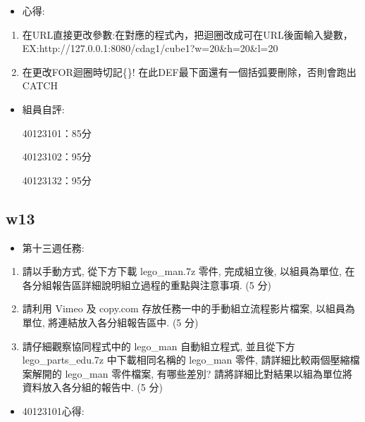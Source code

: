 \documentclass[]{article}
\begin{document}
\begin{itemize}
\itemsep1pt\parskip0pt
\item
  心得:
\end{itemize}

\begin{enumerate}
\def\labelenumi{\arabic{enumi}.}
\itemsep1pt\parskip0pt
\item
  在URL直接更改參數:在對應的程式內，把迴圈改成可在URL後面輸入變數，EX:http://127.0.0.1:8080/cdag1/cube1?w=20\&h=20\&l=20
\item
  在更改FOR迴圈時切記\{\}!
  在此DEF最下面還有一個括弧要刪除，否則會跑出CATCH
\end{enumerate}

\begin{itemize}
\item
  組員自評:

  40123101：85分

  40123102：95分

  40123132：95分
\end{itemize}

\subsection{w13}\label{w13}

\begin{itemize}
\itemsep1pt\parskip0pt
\item
  第十三週任務:
\end{itemize}

\begin{enumerate}
\def\labelenumi{\arabic{enumi}.}
\item
  請以手動方式, 從下方下載 lego\_man.7z 零件, 完成組立後, 以組員為單位,
  在各分組報告區詳細說明組立過程的重點與注意事項. (5 分)
\item
  請利用 Vimeo 及 copy.com 存放任務一中的手動組立流程影片檔案,
  以組員為單位, 將連結放入各分組報告區中. (5 分)
\item
  請仔細觀察協同程式中的 lego\_man 自動組立程式, 並且從下方
  lego\_parts\_edu.7z 中下載相同名稱的 lego\_man 零件,
  請詳細比較兩個壓縮檔案解開的 lego\_man 零件檔案, 有哪些差別?
  請將詳細比對結果以組為單位將資料放入各分組的報告中. (5 分)
\end{enumerate}

\begin{itemize}
\itemsep1pt\parskip0pt
\item
  40123101心得:
\end{itemize}
\end{document}
